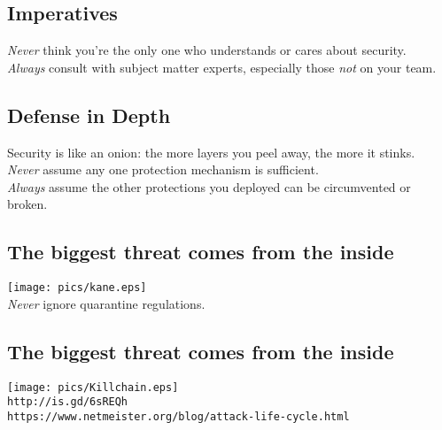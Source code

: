 \documentclass[xga]{xdvislides}
\begin{document}
\subsection{Imperatives}
\vspace*{\fill}
\Huge
\begin{center}
{\em Never} think you're the only one who understands
or cares about security. \\

\addvspace{.5in}
{\em Always} consult with subject matter experts,
especially those {\em not} on your team.
\end{center}
\Normalsize
\vspace*{\fill}

\subsection{Defense in Depth}
\vspace*{\fill}
\Huge
\begin{center}
	Security is like an onion:
	the more layers you peel away, the more it stinks. \\
\addvspace{.5in}
\Normalsize
{\em Never} assume any one protection mechanism is sufficient. \\
\addvspace{.25in}
{\em Always} assume the other protections you deployed
can be circumvented or broken.
\end{center}
\vspace*{\fill}

\subsection{The biggest threat comes from the inside}
\vspace*{\fill}
\begin{center}
	\texttt{[image: pics/kane.eps]} \\
\small
	{\em Never} ignore quarantine regulations.
\Normalsize
\end{center}
\vspace*{\fill}

\subsection{The biggest threat comes from the inside}
\vspace*{\fill}
\begin{center}
	\texttt{[image: pics/Killchain.eps]} \\
\small
	\verb+http://is.gd/6sREQh+ \\
	\verb+https://www.netmeister.org/blog/attack-life-cycle.html+
\Normalsize
\end{center}
\vspace*{\fill}
\end{document}
